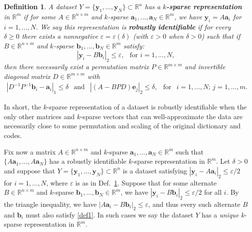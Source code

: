 \documentclass[journal, onecolumn]{IEEEtran}
\newtheorem{definition}{Definition}
\begin{document}
\begin{definition}\label{Uniqueness}
A dataset $Y = \{\mathbf{y}_1, \ldots, \mathbf{y}_N\} \subset \mathbb{R}^n$ has a \textbf{$k$-sparse representation} in $\mathbb{R}^m$ if for some $A \in \mathbb{R}^{n \times m}$ and $k$-sparse $\mathbf{a}_1, \ldots, \mathbf{a}_N \in \mathbb{R}^m$, we have $\mathbf{y}_i = A\mathbf{a}_i$ for $i = 1, \ldots, N$. We say this representation is \textbf{robustly identifiable} if for every $\delta \geq 0$ there exists a nonnegative $\varepsilon = \varepsilon(\delta)$ (with $\varepsilon > 0$ when $\delta > 0$) such that if $B \in \mathbb{R}^{n \times m}$ and $k$-sparse $\mathbf{b}_1, \ldots, \mathbf{b}_N \in \mathbb{R}^m$ satisfy:
\[|\mathbf{y}_i - B\mathbf{b}_i|_2 \leq \varepsilon, \ \ \text{ for } i = 1, \ldots, N,\]
%
then there necessarily exist a permutation matrix $P \in \mathbb{R}^{m \times m}$ and invertible diagonal matrix $D \in \mathbb{R}^{m \times m}$ with
\begin{align}\label{def1}
|D^{-1}P^{-1}\mathbf{b}_i - \mathbf{a}_i|_1 \leq \delta \ \ \text{ and } \ \ |(A - BPD)\mathbf{e}_j|_2 \leq \delta, \ \ \text{ for } \ \ i = 1, \ldots, N; \, j = 1, \ldots, m.
\end{align}
\end{definition}

In short, the $k$-sparse representation of a dataset is robustly identifiable when the only other matrices and $k$-sparse vectors that can well-approximate the data are necessarily close to some permutation and scaling of the original dictionary and codes.

Fix now a matrix $A \in \mathbb{R}^{n \times m}$ and $k$-sparse $\mathbf{a}_1, \ldots, \mathbf{a}_N \in \mathbb{R}^m$ such that $\{A\mathbf{a}_1, \ldots, A\mathbf{a}_N\}$ has a robustly identifiable $k$-sparse representation in $\mathbb{R}^m$. Let $\delta > 0$ and suppose that $Y = \{\mathbf{y}_1, \ldots, \mathbf{y}_N\} \subset \mathbb{R}^n$ is a dataset satisfying $|\mathbf{y}_i - A\mathbf{a}_i|_2 \leq \varepsilon/2$ for $i = 1, \ldots, N$, where $\varepsilon$ is as in Def.~\ref{Uniqueness}. %
Suppose that for some alternate $B \in \mathbb{R}^{n \times m}$ and $k$-sparse $\mathbf{b}_1, \ldots, \mathbf{b}_N \in \mathbb{R}^m$, we have $|\mathbf{y}_i - B\mathbf{b}_i|_2 \leq \varepsilon/2$ for all $i$. 
By the triangle inequality, we have $|A\mathbf{a}_i - B\mathbf{b}_i|_2 \leq \varepsilon$, and thus every such alternate $B$ and $\mathbf{b}_i$ must also satisfy \eqref{def1}. 
In such cases we say the dataset $Y$ has a \textit{unique} $k$-sparse representation in $\mathbb{R}^m$. 
\end{document}
